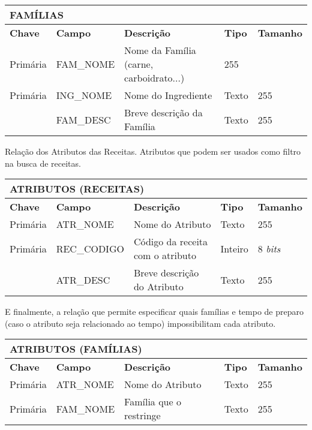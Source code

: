 \documentclass[a4paper]{article}
\begin{document}
\begin{center}
\begin{tabular}{ l | l || l | l l }
  \multicolumn{5}{l}{\textbf{FAMÍLIAS}} \\
  \hline
  \textbf{Chave} & \textbf{Campo} & \textbf{Descrição} & \textbf{Tipo} & \textbf{Tamanho} \\
  \cline{1-5}
  Primária & FAM\_NOME & Nome da Família (carne, carboidrato...) & 255 \\
  Primária & ING\_NOME & Nome do Ingrediente & Texto & 255 \\
  & FAM\_DESC & Breve descrição da Família & Texto & 255
\end{tabular}
\end{center}

Relação dos Atributos das Receitas. Atributos que podem ser usados como filtro na busca de receitas.

\begin{center}
\begin{tabular}{ l | l || l | l l }
  \multicolumn{5}{l}{\textbf{ATRIBUTOS (RECEITAS)}} \\
  \hline
  \textbf{Chave} & \textbf{Campo} & \textbf{Descrição} & \textbf{Tipo} & \textbf{Tamanho} \\
  \cline{1-5}
  Primária & ATR\_NOME & Nome do Atributo & Texto & 255 \\
  Primária & REC\_CODIGO & Código da receita com o atributo & Inteiro & 8 \emph{bits} \\
   & ATR\_DESC & Breve descrição do Atributo & Texto & 255
\end{tabular}
\end{center}

E finalmente, a relação que permite especificar quais famílias e tempo de preparo (caso o atributo seja relacionado ao tempo) impossibilitam cada atributo.

\begin{center}
\begin{tabular}{ l | l || l | l l }
  \multicolumn{5}{l}{\textbf{ATRIBUTOS (FAMÍLIAS)}} \\
  \hline
  \textbf{Chave} & \textbf{Campo} & \textbf{Descrição} & \textbf{Tipo} & \textbf{Tamanho} \\
  \cline{1-5}
  Primária & ATR\_NOME & Nome do Atributo& Texto & 255 \\
  Primária & FAM\_NOME & Família que o restringe & Texto & 255
\end{tabular}
\end{center}
\end{document}
